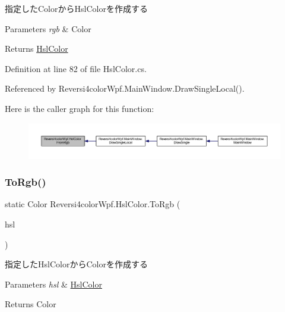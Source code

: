 指定した\+Colorから\+Hsl\+Colorを作成する 


\begin{DoxyParams}{Parameters}
{\em rgb} & Color\\
\hline
\end{DoxyParams}
\begin{DoxyReturn}{Returns}
\hyperlink{class_reversi4color_wpf_1_1_hsl_color}{Hsl\+Color}
\end{DoxyReturn}


Definition at line 82 of file Hsl\+Color.\+cs.



Referenced by Reversi4color\+Wpf.\+Main\+Window.\+Draw\+Single\+Local().

Here is the caller graph for this function\+:\nopagebreak
\begin{figure}[H]
\begin{center}
\leavevmode
\includegraphics[width=350pt]{class_reversi4color_wpf_1_1_hsl_color_a3d77f09a4e86a60d6d135d8ffbcd3298_icgraph}
\end{center}
\end{figure}
\mbox{\label{class_reversi4color_wpf_1_1_hsl_color_a7b0fd43bbad55f9f383cceeda28e9103}} 
\subsubsection{\texorpdfstring{To\+Rgb()}{ToRgb()}}
{\footnotesize\ttfamily static Color Reversi4color\+Wpf.\+Hsl\+Color.\+To\+Rgb (\begin{DoxyParamCaption}\item[{\hyperlink{class_reversi4color_wpf_1_1_hsl_color}{Hsl\+Color}}]{hsl }\end{DoxyParamCaption})\hspace{0.3cm}{\ttfamily [static]}}



指定した\+Hsl\+Colorから\+Colorを作成する 


\begin{DoxyParams}{Parameters}
{\em hsl} & \hyperlink{class_reversi4color_wpf_1_1_hsl_color}{Hsl\+Color}\\
\hline
\end{DoxyParams}
\begin{DoxyReturn}{Returns}
Color
\end{DoxyReturn}


